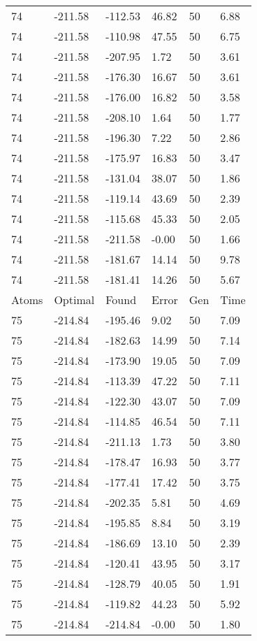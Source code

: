 \documentclass{report}
\begin{document}
\begin{appendix}
\begin{longtable}{llllll}
74 & -211.58 & -112.53 & 46.82 & 50 & 6.88 \\
74 & -211.58 & -110.98 & 47.55 & 50 & 6.75 \\
74 & -211.58 & -207.95 & 1.72 & 50 & 3.61 \\
74 & -211.58 & -176.30 & 16.67 & 50 & 3.61 \\
74 & -211.58 & -176.00 & 16.82 & 50 & 3.58 \\
74 & -211.58 & -208.10 & 1.64 & 50 & 1.77 \\
74 & -211.58 & -196.30 & 7.22 & 50 & 2.86 \\
74 & -211.58 & -175.97 & 16.83 & 50 & 3.47 \\
74 & -211.58 & -131.04 & 38.07 & 50 & 1.86 \\
74 & -211.58 & -119.14 & 43.69 & 50 & 2.39 \\
74 & -211.58 & -115.68 & 45.33 & 50 & 2.05 \\
74 & -211.58 & -211.58 & -0.00 & 50 & 1.66 \\
74 & -211.58 & -181.67 & 14.14 & 50 & 9.78 \\
74 & -211.58 & -181.41 & 14.26 & 50 & 5.67 \\
Atoms & Optimal & Found & Error & Gen & Time \\
75 & -214.84 & -195.46 & 9.02 & 50 & 7.09 \\
75 & -214.84 & -182.63 & 14.99 & 50 & 7.14 \\
75 & -214.84 & -173.90 & 19.05 & 50 & 7.09 \\
75 & -214.84 & -113.39 & 47.22 & 50 & 7.11 \\
75 & -214.84 & -122.30 & 43.07 & 50 & 7.09 \\
75 & -214.84 & -114.85 & 46.54 & 50 & 7.11 \\
75 & -214.84 & -211.13 & 1.73 & 50 & 3.80 \\
75 & -214.84 & -178.47 & 16.93 & 50 & 3.77 \\
75 & -214.84 & -177.41 & 17.42 & 50 & 3.75 \\
75 & -214.84 & -202.35 & 5.81 & 50 & 4.69 \\
75 & -214.84 & -195.85 & 8.84 & 50 & 3.19 \\
75 & -214.84 & -186.69 & 13.10 & 50 & 2.39 \\
75 & -214.84 & -120.41 & 43.95 & 50 & 3.17 \\
75 & -214.84 & -128.79 & 40.05 & 50 & 1.91 \\
75 & -214.84 & -119.82 & 44.23 & 50 & 5.92 \\
75 & -214.84 & -214.84 & -0.00 & 50 & 1.80 \\

\end{longtable}
\end{appendix}
\end{document}
